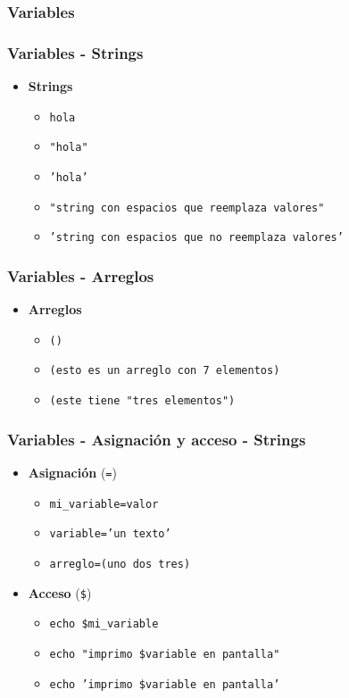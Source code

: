 \subsubsection{Variables}

\begin{frame}
  \frametitle{Variables - Strings}
  \begin{itemize}
    \item \textbf{Strings}
    \begin{itemize}
      \item \texttt{hola}
      \item \texttt{\string"hola\string"}
      \item \texttt{\string'hola\string'}
      \item \texttt{\string"string con espacios que reemplaza valores\string"}
      \item \texttt{\string'string con espacios que no reemplaza valores\string'}
    \end{itemize}
  \end{itemize}
\end{frame}

\begin{frame}
  \frametitle{Variables - Arreglos}
  \begin{itemize}
    \item \textbf{Arreglos}
    \begin{itemize}
      \item \texttt{()}
      \item \texttt{(esto es un arreglo con 7 elementos)}
      \item \texttt{(este tiene \string"tres elementos\string")}
    \end{itemize}
  \end{itemize}
\end{frame}

\begin{frame}
  \frametitle{Variables - Asignación y acceso - Strings}
  \begin{itemize}
    \item \textbf{Asignación} (\texttt{=})
    \begin{itemize}
      \item \texttt{mi\_variable=valor}
      \item \texttt{variable=\string'un texto\string'}
      \item \texttt{arreglo=(uno dos tres)}
    \end{itemize}
    \item \textbf{Acceso} (\texttt{\${}})
    \begin{itemize}
      \item \texttt{echo \$mi\_variable}
      \item \texttt{echo \string"imprimo \$variable en pantalla\string"}
      \item \texttt{echo \string'imprimo \$variable en pantalla\string'}
    \end{itemize}
  \end{itemize}
\end{frame}


